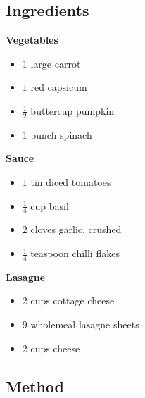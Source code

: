 \documentclass[11pt,a4paper]{article}
\begin{document}
\subsection*{Ingredients}

\begin{multicols}{3}

\textbf{Vegetables}

\begin{itemize}
  \item $ 1 $ large carrot
  \item $ 1 $ red capsicum
  \item $ \frac {1} {2} $ buttercup pumpkin
  \item $ 1 $ bunch spinach
\end{itemize}

\columnbreak

\textbf{Sauce}

\begin{itemize}
\item $ 1 $ tin diced tomatoes
\item $ \frac {1} {4} $ cup basil
\item $ 2 $ cloves garlic, crushed
\item $ \frac {1} {4} $ teaspoon chilli flakes
\end{itemize}

\columnbreak

\textbf{Lasagne}

\begin{itemize}
\item $ 2 $ cups cottage cheese
\item $ 9 $ wholemeal lasagne sheets
\item $ 2 $ cups cheese
\end{itemize}

\end{multicols}

\medskip

\subsection*{Method}
\end{document}

